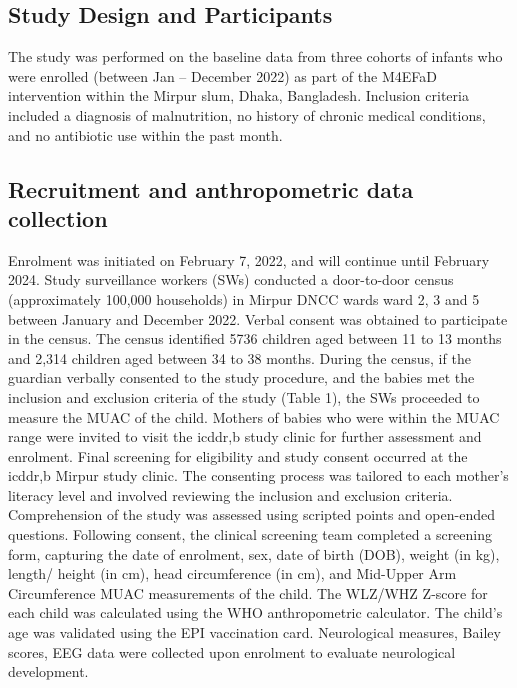 \documentclass{article}
\begin{document}
\subsection*{Study Design and Participants}
The study was performed on the baseline data from three cohorts of infants who were enrolled (between Jan – December 2022) as part of the M4EFaD intervention within the Mirpur slum, Dhaka, Bangladesh.
Inclusion criteria included a diagnosis of malnutrition, no history of chronic medical conditions, and no antibiotic use within the past month.

\subsection*{Recruitment and anthropometric data collection}
Enrolment was initiated on February 7, 2022, and will continue until February 2024.
Study surveillance workers (SWs) conducted a door-to-door census (approximately 100,000 households) in Mirpur DNCC wards ward 2, 3 and 5 between January and December 2022.
Verbal consent was obtained to participate in the census.
The census identified 5736 children aged between 11 to 13 months and 2,314 children aged between 34 to 38 months.
During the census, if the guardian verbally consented to the study procedure, and the babies met the inclusion and exclusion criteria of the study (Table 1), the SWs proceeded to measure the MUAC of the child.
Mothers of babies who were within the MUAC range were invited to visit the icddr,b study clinic for further assessment and enrolment.
Final screening for eligibility and study consent occurred at the icddr,b Mirpur study clinic.
The consenting process was tailored to each mother's literacy level and involved reviewing the inclusion and exclusion criteria.
Comprehension of the study was assessed using scripted points and open-ended questions.
Following consent, the clinical screening team completed a screening form, capturing the date of enrolment, sex, date of birth (DOB), weight (in kg), length/ height (in cm), head circumference (in cm), and Mid-Upper Arm Circumference MUAC measurements of the child.
The WLZ/WHZ Z-score for each child was calculated using the WHO anthropometric calculator.
The child's age was validated using the EPI vaccination card.
Neurological measures, Bailey scores, EEG data were collected upon enrolment to evaluate neurological development.
\end{document}
